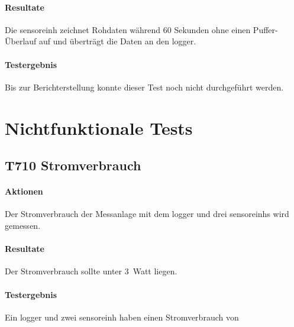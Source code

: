 \paragraph{Resultate} Die \gls{sensoreinh} zeichnet Rohdaten während 60 Sekunden ohne einen Puffer-Überlauf auf und überträgt die Daten an den \gls{logger}.

\paragraph{Testergebnis} Bis zur Berichterstellung konnte dieser Test noch nicht durchgeführt werden.

\section{Nichtfunktionale Tests}
\subsection{T710 Stromverbrauch}
\paragraph{Aktionen} Der Stromverbrauch der Messanlage mit dem \gls{logger} und drei \glspl{sensoreinh} wird gemessen. 

\paragraph{Resultate} Der Stromverbrauch sollte unter 3~Watt liegen.

\paragraph{Testergebnis} Ein \gls{logger} und zwei \gls{sensoreinh} haben einen Stromverbrauch von 
